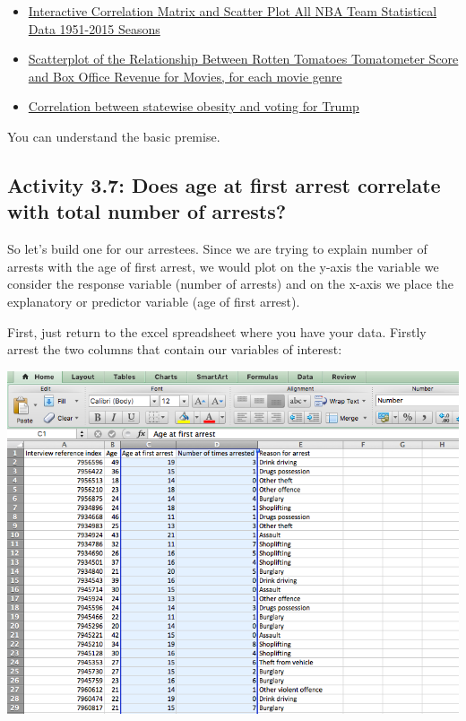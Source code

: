 \documentclass[
]{book}
\providecommand{\tightlist}{%
  \setlength{\itemsep}{0pt}\setlength{\parskip}{0pt}}
\begin{document}
\begin{itemize}
\tightlist
\item
  \href{http://asbcllc.com/blog/2014/december/nba_team_corr_matrix/scaled/}{Interactive Correlation Matrix and Scatter Plot All NBA Team Statistical Data 1951-2015 Seasons}
\item
  \href{http://rebrn.com/re/relationship-between-rotten-tomatoes-tomatometer-score-and-box-o-2558335/}{Scatterplot of the Relationship Between Rotten Tomatoes Tomatometer Score and Box Office Revenue for Movies, for each movie genre}
\item
  \href{https://fsmedia.imgix.net/af/f3/d7/f5/b2df/470f/8f8c/4b41daf55348/the-correlation-between-trump-voters-and-obesity-has-a-strong-positive-correlation-at-0717.png}{Correlation between statewise obesity and voting for Trump}
\end{itemize}

You can understand the basic premise.

\hypertarget{activity-3.7-does-age-at-first-arrest-correlate-with-total-number-of-arrests}{%
\subsection{Activity 3.7: Does age at first arrest correlate with total number of arrests?}\label{activity-3.7-does-age-at-first-arrest-correlate-with-total-number-of-arrests}}

So let's build one for our arrestees. Since we are trying to explain number of arrests with the age of first arrest, we would plot on the y-axis the variable we consider the response variable (number of arrests) and on the x-axis we place the explanatory or predictor variable (age of first arrest).

First, just return to the excel spreadsheet where you have your data. Firstly arrest the two columns that contain our variables of interest:

\includegraphics{imgs/scatter_1.png}
\end{document}
